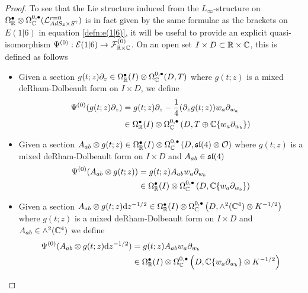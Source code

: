 \begin{proof}
To see that the Lie structure induced from the $L_\infty$-structure on $\Omega^\bullet_{\mathbb{R}}\otimes \Omega^{0,\bullet}_{\mathbb{C}} (\mathcal{L}^{r=0}_{AdS_4\times S^7} )$ is in fact given by the same formulae as the brackets on $E(1|6)$ in equation \ref{defn:e(1|6)}, it will be useful to provide an explicit quasi-isomorphism $\Psi^{(0)} : \mathcal{E}(1|6) \to \mathcal{F}^{(0)}_{\mathbb{R}\times \mathbb{C}}$. On an open set $I\times D\subset \mathbb{R}\times \mathbb{C}$, this is defined as follows

\begin{itemize}
\item Given a section $g(t; z) \partial_z \in \Omega^\bullet_{\mathbb{R}} (I)\otimes \Omega^{0,\bullet}_{\mathbb{C}} (D, T)$ where $g(t;z)$ is a mixed deRham-Dolbeault form on $I \times D$, we define
\begin{align*}
\Psi^{(0)} (g(t;z)\partial_z) &= g(t;z)\partial_z - \frac 14 (\partial_z g(t; z)) w_a\partial_{w_a} \\
&\in \Omega^\bullet_{\mathbb{R}} (I) \otimes \Omega^{0,\bullet}_{\mathbb{C}} \left ( D, T \oplus \mathbb{C}\{w_a\partial _{w_b} \} \right )
\end{align*}
\item Given a section $A_{ab} \otimes g(t; z) \in \Omega^\bullet_{\mathbb{R}} (I)\otimes \Omega^{0,\bullet}_{\mathbb{C}} \left (D, \mathfrak{sl}(4)\otimes \mathcal{O} \right )$ where $g(t;z)$ is a mixed deRham-Dolbeault form on $I \times D$ and $A_{ab}\in \mathfrak{sl}(4)$
\begin{align*}
\Psi^{(0)} (A_{ab} \otimes g(t;z)) &= g(t;z)A_{ab}w_a\partial_{w_b} \\
&\in \Omega^\bullet_{\mathbb{R}} (I) \otimes \Omega^{0,\bullet}_{\mathbb{C}} \left ( D, \mathbb{C}\{w_a\partial _{w_b}\} \right )
\end{align*}

\item Given a section $A_{ab} \otimes g(t; z)\mathrm{d} z^{-1/2} \in \Omega^\bullet_{\mathbb{R}} (I)\otimes \Omega^{0,\bullet}_{\mathbb{C}} \left (D, \wedge^2 (\mathbb{C}^4) \otimes K^{-1/2}\right )$
where $g(t;z)$ is a mixed deRham-Dolbeault form on $I\times D$ and $A_{ab} \in \wedge^2 (\mathbb{C}^4)$ we define
\begin{align*}
\Psi^{(0)} (A_{ab} \otimes g(t; z)\mathrm{d} z^{-1/2}) &= g(t;z)  A_{ab} w_a \partial_{w_b} \\
&\in \Omega^\bullet_{\mathbb{R}} (I) \otimes \Omega^{0,\bullet}_{\mathbb{C}} \left ( D, \mathbb{C}\{w_a\partial _{w_b} \}\otimes K^{-1/2} \right )
\end{align*}



\end{itemize}
\end{proof}
